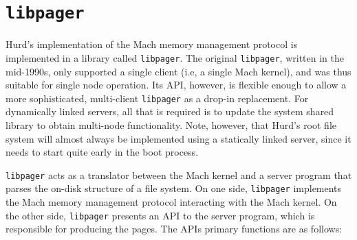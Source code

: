\documentclass{article}
\def\libpager{{\tt libpager}\xspace}
\begin{document}
\begin{comment}
For example, consider (again) what happens when node A drops its last
send right to a port on node B.  Node A sends a NO SENDERS message to
node B and forgets about the port.  It's possible that node B has sent
node A another send right for the same port, and that it's in transit
when node A sends the NO SENDERS message.  In that case, node A would
actually have an outstanding send right when node B receives the NO
SENDERS message, which would cause node B to incorrectly drop the send
right linked to node A.  I can see no way around this except a more
complicated handshake where the NO SENDERS message from node A to node
B would include a sequence number allowing node B to determine that it
hadn't sent any additional send rights, and a reply message from node
B to node A finalizing the port deallocation.  (what about SEQNOS?)
\end{comment}

\section{\libpager}

Hurd's implementation of the Mach memory management protocol is
implemented in a library called \libpager.  The original \libpager,
written in the mid-1990s, only supported a single client (i.e, a
single Mach kernel), and was thus suitable for single node operation.
Its API, however, is flexible enough to allow a more sophisticated,
multi-client \libpager as a drop-in replacement.  For dynamically
linked servers, all that is required is to update the system shared
library to obtain multi-node functionality.  Note, however, that
Hurd's root file system will almost always be implemented using a
statically linked server, since it needs to start quite early in
the boot process.

\libpager acts as a translator between the Mach kernel and a
server program that parses the on-disk structure of a file system.
On one side, \libpager implements the Mach memory management protocol
interacting with the Mach kernel.  On the other side, \libpager
presents an API to the server program, which is responsible for
producing the pages.  The APIs primary functions are as follows:
\end{document}
